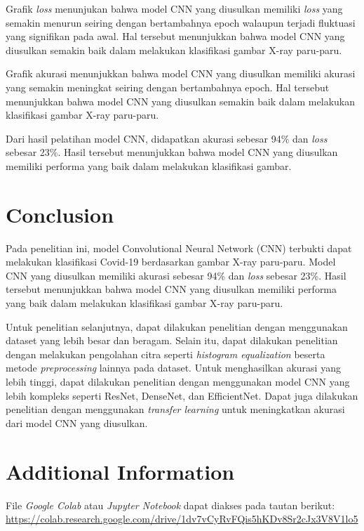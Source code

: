 \documentclass[conference]{IEEEtran}
\begin{document}
Grafik \textit{loss} menunjukan bahwa model CNN yang diusulkan memiliki \textit{loss} yang semakin menurun seiring dengan bertambahnya epoch walaupun terjadi fluktuasi yang signifikan pada awal. Hal tersebut menunjukkan bahwa model CNN yang diusulkan semakin baik dalam melakukan klasifikasi gambar X-ray paru-paru.

Grafik akurasi menunjukkan bahwa model CNN yang diusulkan memiliki akurasi yang semakin meningkat seiring dengan bertambahnya epoch. Hal tersebut menunjukkan bahwa model CNN yang diusulkan semakin baik dalam melakukan klasifikasi gambar X-ray paru-paru.

Dari hasil pelatihan model CNN, didapatkan akurasi sebesar 94\% dan \textit{loss} sebesar 23\%. Hasil tersebut menunjukkan bahwa model CNN yang diusulkan memiliki performa yang baik dalam melakukan klasifikasi gambar.

\section{Conclusion}
Pada penelitian ini, model Convolutional Neural Network (CNN) terbukti dapat melakukan klasifikasi Covid-19 berdasarkan gambar X-ray paru-paru. Model CNN yang diusulkan memiliki akurasi sebesar 94\% dan \textit{loss} sebesar 23\%. Hasil tersebut menunjukkan bahwa model CNN yang diusulkan memiliki performa yang baik dalam melakukan klasifikasi gambar X-ray paru-paru. 

Untuk penelitian selanjutnya, dapat dilakukan penelitian dengan menggunakan dataset yang lebih besar dan beragam. Selain itu, dapat dilakukan penelitian dengan melakukan pengolahan citra seperti \textit{histogram equalization} beserta metode \textit{preprocessing} lainnya pada dataset. Untuk menghasilkan akurasi yang lebih tinggi, dapat dilakukan penelitian dengan menggunakan model CNN yang lebih kompleks seperti ResNet, DenseNet, dan EfficientNet. Dapat juga dilakukan penelitian dengan menggunakan \textit{transfer learning} untuk meningkatkan akurasi dari model CNN yang diusulkan.

\section{Additional Information}
File \textit{Google Colab} atau \textit{Jupyter Notebook} dapat diakses pada tautan berikut: \url{https://colab.research.google.com/drive/1dv7vCyRvFQis5hKDv8Sr2cJx3V8V1lo5}
\end{document}
